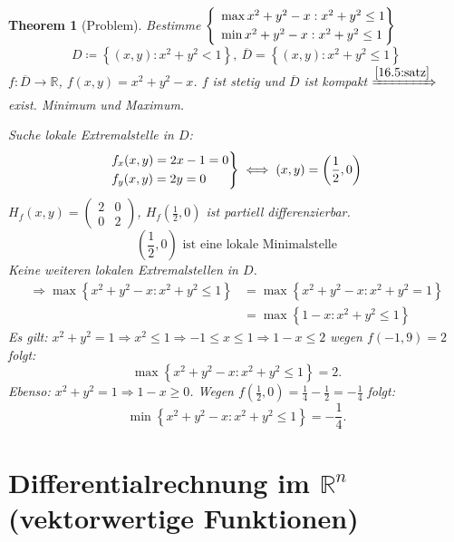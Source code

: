 \documentclass[12pt]{extreport} %
\newcommand{\R}{\mathbb{R}}
\theoremstyle{named}
\theoremstyle{nnamed}
\newtheorem*{unnamedtheorem*}{Theorem}
\theoremstyle{itshape}
\theoremstyle{normal}
\begin{document}
\begin{unnamedtheorem*}[Problem]
	Bestimme $\begin{cases} ~ \begin{rcases}  \max x^{2} + y^{2} - x : x^{2} + y^{2} \leq 1 \\ \min x^{2} + y^{2} - x : x^{2} + y^{2} \leq 1 \end{rcases} ~ \end{cases}$
		$$ D \coloneqq \left\{ (x,y) : x^{2} + y^{2} < 1 \right\}, ~ \overline{D} = \left\{ (x,y) : x^{2} + y^{2} \leq 1 \right\} $$
	$f \colon \overline{D} \rightarrow \R$, $f(x,y) = x^{2} + y^{2} - x$. $f$ ist stetig und $\overline{D}$ ist kompakt $\xRightarrow[]{\ref{16.5:satz}}$ exist. Minimum und Maximum.
	
	\bigskip

	Suche lokale Extremalstelle in $D$:
		$$ \begin{rcases} f_{x}(x, y) = 2x - 1 = 0 \\ f_{y}(x,y) = 2y = 0 ~\end{rcases} \iff (x, y) = \left( \frac{1}{2}, 0 \right) $$
	$H_{f}(x,y) = \begin{pmatrix} 2 & 0 \\ 0 & 2 \end{pmatrix}$, $H_{f}\left(\frac{1}{2}, 0\right)$ ist partiell differenzierbar.
		$$ \left( \frac{1}{2}, 0 \right) \text{ ist eine lokale Minimalstelle} $$
	Keine weiteren lokalen Extremalstellen in $D$. 
	\begin{align*}
	 	\Rightarrow \max \left\{ x^{2} + y^{2} - x : x^{2} + y^{2} \leq 1 \right\} & = \max \left\{ x^{2} + y^{2} - x : x^{2} + y^{2} = 1  \right\} \\
		 & = \max \left\{ 1 - x : x^{2} + y^{2} \leq 1  \right\} 
	\end{align*}
	Es gilt: $x^{2} + y^{2} = 1 \Rightarrow x^{2} \leq 1 \Rightarrow -1 \leq x \leq 1 \Rightarrow 1 - x \leq 2$ wegen $f(-1, 9) = 2$ folgt:
		$$ \max \left\{ x^{2} + y^{2} - x : x^{2} + y^{2} \leq 1 \right\} = 2. $$
	Ebenso: $x^{2} + y^{2} = 1 \Rightarrow 1 - x \geq 0$. Wegen $f \left( \frac{1}{2}, 0 \right) = \frac{1}{4} - \frac{1}{2} = - \frac{1}{4}$ folgt:
		$$ \min \left\{ x^{2} + y^{2} - x : x^{2} + y^{2} \leq 1 \right\} = - \frac{1}{4}. $$
\end{unnamedtheorem*}

\chapter{Differentialrechnung im \texorpdfstring{$\R^{n}$}{Rn} (vektorwertige Funktionen)}
\end{document}
